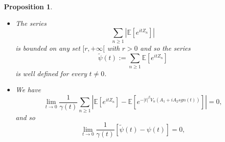 \documentclass[oneside, a4paper,11pt,reqno]{amsart}
\newtheorem{prop}[hypo]{Proposition}
\begin{document}
\begin{prop}\label{tildepsi}
\begin{itemize}
\item[i)-] The series 
$$ \sum_{n\ge 1} | {\mathbb E}[e^{itZ_n}] | $$
is bounded on any set $[r,+\infty[$ with $r>0$ and so the series 
$$\tilde{\psi}(t):= \sum_{n\ge 1} {\mathbb E}[e^{itZ_n}] $$
is well defined for every  $t\neq 0$.
\item[ii)-] We have
\begin{equation*}
\lim_{t\rightarrow 0} \frac 1{\gamma(t)} \sum_{n\ge 1} \left| {\mathbb E}[e^{itZ_n}] -  {\mathbb E}\left[e^{-|t|^\beta V_n(A_1+iA_2 sgn(t))}\right]\right|=0,
\end{equation*}
and so
\begin{equation*}
\lim_{t\rightarrow 0} \frac 1{\gamma(t)} [\tilde{\psi}(t)-\psi(t)]=0,
\end{equation*}\end{itemize}
\end{prop}
\end{document}
